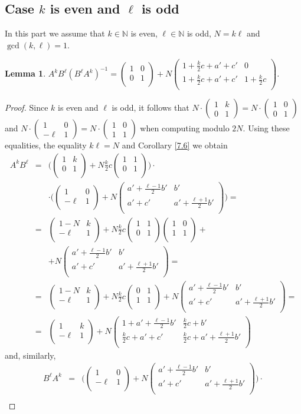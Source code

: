 \documentclass[10pt]{amsart}
\theoremstyle{plain}
\newtheorem{lemma}[theorem]{Lemma}
\theoremstyle{definition}
\theoremstyle{remark}%
\newcommand{\N}{\mathbb{N}}
\newcommand{\mat}[4]{\left(\begin{array}{cc}
 #1 & #2\\
 #3 & #4\\
\end{array}\right)}
\begin{document}
\subsection{Case $k$ is  even and $\ell$ is odd}


In this part we assume that $k\in\N$ is even, $\ell\in\N$ is odd,  $N=k\ell$ and $\gcd(k,\ell)=1$.
\begin{lemma}\label{even_odd}
 $A^k B^\ell(B^\ell A^k)^{-1}=\mat{1}{0}{0}{1}+N
 \mat{1+\frac{k}{2}c+a'+c'}{0}{1+\frac{k}{2}c+a'+c'}{1+\frac{k}{2}c}$.
\end{lemma}
\begin{proof}
Since $k$ is even and $\ell$ is odd, it follows that $N\cdot(\begin{smallmatrix}1 & k\\ 0 & 1\end{smallmatrix})=N\cdot(\begin{smallmatrix}1 & 0\\ 0 & 1\end{smallmatrix})$ and $N\cdot(\begin{smallmatrix}1 & 0\\ -\ell & 1\end{smallmatrix})=N\cdot(\begin{smallmatrix}1 & 0\\ 1 & 1\end{smallmatrix})$ when computing modulo $2N$. Using these equalities, the equality $k\ell=N$ and Corollary \ref{7.6} we obtain
\begin{eqnarray*}
 A^k B^\ell &=& \Bigg(\mat{1}{k}{0}{1}+N\tfrac{k}{2}c\mat{1}{1}{0}{1}\Bigg)\cdot
 \\&&\cdot\Bigg(\mat{1}{0}{-\ell}{1}+N\mat{a'+\frac{\ell-1}{2}b'}{b'}{a'+c'}{a'+\frac{\ell+1}{2}b'}\Bigg)=
\\&=&\mat{1-N}{k}{-\ell}{1}+N\tfrac{k}{2}c\mat{1}{1}{0}{1}\mat{1}{0}{1}{1}+\\
&&+N\mat{a'+\frac{\ell-1}{2}b'}{b'}{a'+c'}{a'+\frac{\ell+1}{2}b'}=
\\&=&\mat{1-N}{k}{-\ell}{1}+N\tfrac{k}{2}c\mat{0}{1}{1}{1}+N\mat{a'+\frac{\ell-1}{2}b'}{b'}{a'+c'}{a'+\frac{\ell+1}{2}b'}=
\\&=&\mat{1}{k}{-\ell}{1}+N\mat{1+a'+\frac{\ell-1}{2}b'}{\frac{k}{2}c+b'}{\frac{k}{2}c+a'+c'}{\frac{k}{2}c+a'+\frac{\ell+1}{2}b'}
 \end{eqnarray*}
and, similarly,
 \begin{eqnarray*}
 B^\ell A^k&=&\Bigg(\mat{1}{0}{-\ell}{1}+N\mat{a'+\frac{\ell-1}{2}b'}{b'}{a'+c'}{a'+\frac{\ell+1}{2}b'}\Bigg)\cdot\\

\end{eqnarray*}
\end{proof}
\end{document}
